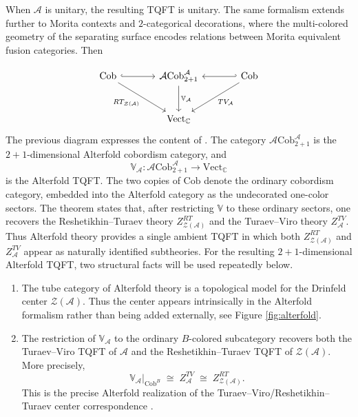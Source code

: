 \documentclass[12pt]{amsart}
\numberwithin{equation}{section}
\theoremstyle{definition}
\begin{document}
When $\mathcal{A}$ is unitary, the resulting TQFT is unitary. The same formalism extends further to Morita contexts and $2$-categorical decorations, where the multi-colored geometry of the separating surface encodes relations between Morita equivalent fusion categories. Then

$$
\begin{tikzcd}[column sep=large, row sep=large]
\mathrm{Cob}
  \arrow[r, hook]
  \arrow[dr, "RT_{\mathcal Z(\mathcal A)}"']
&
\mathrm{\mathcal ACob}_{2+1}^{\mathcal A}
  \arrow[d, "\mathbb V_{\mathcal A}"]
&
\mathrm{Cob}
  \arrow[l, hook']
  \arrow[dl, "TV_{\mathcal A}"]
\\
& \mathrm{Vect}_{\mathbb C}
\end{tikzcd}
$$
The previous diagram expresses the content of \cite[Theorem~\ref{thm:center-criterion}]{Alterfold1}. The category $\mathrm{\mathcal ACob}^{\mathcal A}_{2+1}$ is the $2+1$-dimensional Alterfold cobordism category, and
$$
\mathbb V_{\mathcal A}\colon \mathrm{\mathcal ACob}_{2+1}^{\mathcal A}\longrightarrow \mathrm{Vect}_{\mathbb C}
$$
is the Alterfold TQFT. The two copies of $\mathrm{Cob}$ denote the ordinary cobordism category, embedded into the Alterfold category as the undecorated one-color sectors. The theorem states that, after restricting $\mathbb V$ to these ordinary sectors, one recovers the Reshetikhin--Turaev theory $Z^{RT}_{\mathcal Z(\mathcal A)}$ and the Turaev--Viro theory $Z^{TV}_{\mathcal A}$. Thus Alterfold theory provides a single ambient TQFT in which both $Z^{RT}_{\mathcal Z(\mathcal A)}$ and $Z^{TV}_{\mathcal A}$ appear as naturally identified subtheories.  For the resulting $2+1$-dimensional Alterfold TQFT, two structural facts will be used repeatedly below.


\begin{enumerate}  \renewcommand{\labelenumi}{\roman{enumi}.}
\item
The tube category of Alterfold theory is a topological model for the Drinfeld center
$\mathcal Z(\mathcal A)$. Thus the center appears intrinsically in the Alterfold formalism rather
than being added externally, see Figure \ref{fig:alterfold}.

\item
The restriction of $\mathbb V_{\mathcal A}$ to the ordinary $B$-colored subcategory
recovers both the Turaev--Viro TQFT of $\mathcal A$ and the Reshetikhin--Turaev TQFT of
$\mathcal Z(\mathcal A)$. More precisely,
$$
\mathbb V_{\mathcal A}\big|_{\mathrm{Cob}^B}
\;\cong\;
Z^{TV}_{\mathcal A}
\;\cong\;
Z^{RT}_{\mathcal Z(\mathcal A)}.
$$
This is the precise Alterfold realization of the Turaev--Viro/Reshetikhin--Turaev center
correspondence \cite[Theorem 5.1]{Alterfold1}.
\end{enumerate}
\end{document}
